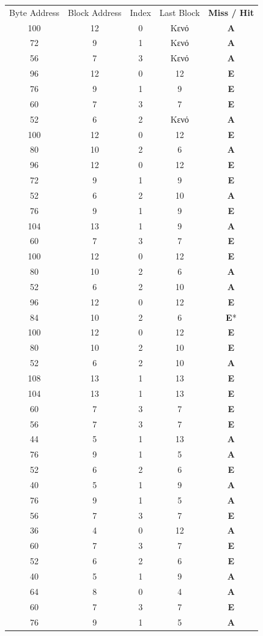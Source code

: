 \documentclass{article}
\begin{document}
\begin{table}[h]
\centering
\small
\begin{tabular}{c|c|c|c|c}
\textlatin{Byte Address} & \textlatin{Block Address} & \textlatin{Index} & \textlatin{Last Block} & \textbf{\textlatin{Miss / Hit}} \\
100 & 12 & 0 & {Κενό} & \textbf{Α} \\
72 & 9 & 1 & {Κενό} & \textbf{Α} \\
56 & 7 & 3 & {Κενό} & \textbf{Α} \\
96 & 12 & 0 & 12 & \textbf{Ε} \\
76 & 9 & 1 & 9 & \textbf{Ε} \\
60 & 7 & 3 & 7 & \textbf{Ε} \\
52 & 6 & 2 & {Κενό} & \textbf{Α} \\
100 & 12 & 0 & 12 & \textbf{Ε} \\
80 & 10 & 2 & 6 & \textbf{Α} \\
96 & 12 & 0 & 12 & \textbf{Ε} \\
72 & 9 & 1 & 9 & \textbf{Ε} \\
52 & 6 & 2 & 10 & \textbf{Α} \\
76 & 9 & 1 & 9 & \textbf{Ε} \\
104 & 13 & 1 & 9 & \textbf{Α} \\
60 & 7 & 3 & 7 & \textbf{Ε} \\
100 & 12 & 0 & 12 & \textbf{Ε} \\
80 & 10 & 2 & 6 & \textbf{Α} \\
52 & 6 & 2 & 10 & \textbf{Α} \\
96 & 12 & 0 & 12 & \textbf{Ε} \\
84 & 10 & 2 & 6 & \textbf{Ε}* \\
100 & 12 & 0 & 12 & \textbf{Ε} \\
80 & 10 & 2 & 10 & \textbf{Ε} \\
52 & 6 & 2 & 10 & \textbf{Α} \\
108 & 13 & 1 & 13 & \textbf{Ε} \\
104 & 13 & 1 & 13 & \textbf{Ε} \\
60 & 7 & 3 & 7 & \textbf{Ε} \\
56 & 7 & 3 & 7 & \textbf{Ε} \\
44 & 5 & 1 & 13 & \textbf{Α} \\
76 & 9 & 1 & 5 & \textbf{Α} \\
52 & 6 & 2 & 6 & \textbf{Ε} \\
40 & 5 & 1 & 9 & \textbf{Α} \\
76 & 9 & 1 & 5 & \textbf{Α} \\
56 & 7 & 3 & 7 & \textbf{Ε} \\
36 & 4 & 0 & 12 & \textbf{Α} \\
60 & 7 & 3 & 7 & \textbf{Ε} \\
52 & 6 & 2 & 6 & \textbf{Ε} \\
40 & 5 & 1 & 9 & \textbf{Α} \\
64 & 8 & 0 & 4 & \textbf{Α} \\
60 & 7 & 3 & 7 & \textbf{Ε} \\
76 & 9 & 1 & 5 & \textbf{Α} \\
\end{tabular}
\end{table}
\end{document}

